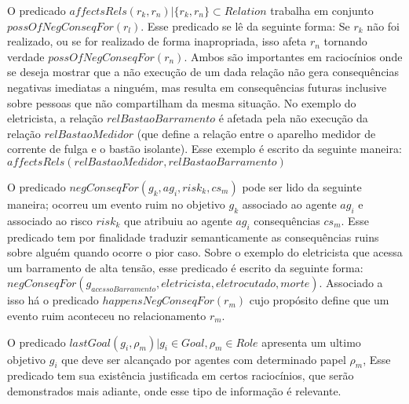 O predicado $affectsRels(r_k,r_n) | \{ r_k, r_n\} \subset Relation $ trabalha em conjunto $possOfNegConseqFor(r_l)$. Esse predicado se lê da seguinte forma: Se $r_k$ não foi realizado, ou se for realizado de forma inapropriada, isso afeta  $r_n$ tornando verdade $possOfNegConseqFor(r_n)$. Ambos são importantes em raciocínios onde se deseja mostrar que a não execução de um dada relação não gera consequências negativas imediatas a ninguém, mas resulta em consequências futuras inclusive sobre pessoas que não compartilham da mesma situação. No exemplo do eletricista, a relação $relBastaoBarramento$ é afetada pela não execução da relação $relBastaoMedidor$ (que define a relação entre o aparelho medidor de corrente de fulga e o bastão isolante). Esse exemplo é escrito da seguinte maneira:$affectsRels(relBastaoMedidor,relBastaoBarramento)$

O predicado $negConseqFor(g_k, ag_i,risk_k,cs_m)$ pode ser lido da seguinte maneira; ocorreu um evento ruim no objetivo $g_k$ associado ao agente $ag_i$ e associado ao risco $risk_k$ que atribuiu ao agente $ag_i$ consequências $cs_m$. Esse predicado tem por finalidade traduzir semanticamente as consequências ruins sobre alguém quando ocorre o pior caso. Sobre o exemplo do eletricista que acessa um barramento de alta tensão, esse predicado é escrito da seguinte forma: $negConseqFor(g_{acessoBarramento}, eletricista,eletrocutado,morte)$. Associado a isso há o predicado $happensNegConseqFor(r_m)$ cujo propósito define que um evento ruim aconteceu no relacionamento $r_m$.

O predicado $lastGoal(g_i,\rho_m) | g_i \in Goal, \rho_m \in Role $ apresenta um ultimo objetivo $g_i$ que deve ser alcançado por agentes com determinado papel $\rho_m$, Esse predicado tem sua existência justificada em certos raciocínios, que serão demonstrados mais adiante, onde esse tipo de informação é relevante.